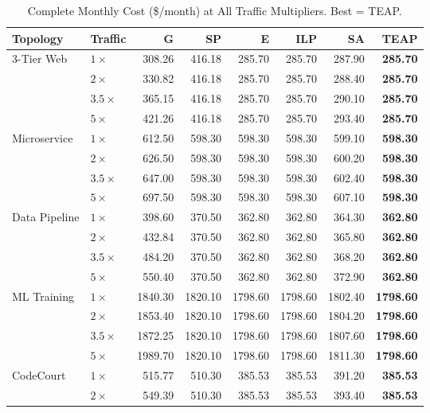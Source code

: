 \documentclass[10pt,journal]{IEEEtran}
\begin{document}
\begin{table}[!t]
\centering
\caption{Complete Monthly Cost (\$/month) at All Traffic Multipliers. Best = TEAP.}\label{tab:full_results}
\scriptsize\setlength{\tabcolsep}{2.0pt}
\begin{tabular}{llrrrrrr}
\toprule
Topology & Traffic & G & SP & E & ILP & SA & TEAP\\
\midrule
3-Tier Web
  & $1\times$ & 308.26 & 416.18 & 285.70 & 285.70 & 287.90 & \textbf{285.70}\\
  & $2\times$ & 330.82 & 416.18 & 285.70 & 285.70 & 288.40 & \textbf{285.70}\\
  & $3.5\times$ &365.15& 416.18 & 285.70 & 285.70 & 290.10 & \textbf{285.70}\\
  & $5\times$ & 421.26 & 416.18 & 285.70 & 285.70 & 293.40 & \textbf{285.70}\\
\midrule
Microservice
  & $1\times$ & 612.50 & 598.30 & 598.30 & 598.30 & 599.10 & \textbf{598.30}\\
  & $2\times$ & 626.50 & 598.30 & 598.30 & 598.30 & 600.20 & \textbf{598.30}\\
  & $3.5\times$ &647.00& 598.30 & 598.30 & 598.30 & 602.40 & \textbf{598.30}\\
  & $5\times$ & 697.50 & 598.30 & 598.30 & 598.30 & 607.10 & \textbf{598.30}\\
\midrule
Data Pipeline
  & $1\times$ & 398.60 & 370.50 & 362.80 & 362.80 & 364.30 & \textbf{362.80}\\
  & $2\times$ & 432.84 & 370.50 & 362.80 & 362.80 & 365.80 & \textbf{362.80}\\
  & $3.5\times$ &484.20& 370.50 & 362.80 & 362.80 & 368.20 & \textbf{362.80}\\
  & $5\times$ & 550.40 & 370.50 & 362.80 & 362.80 & 372.90 & \textbf{362.80}\\
\midrule
ML Training
  & $1\times$ &1840.30&1820.10 &1798.60 &1798.60 &1802.40& \textbf{1798.60}\\
  & $2\times$ &1853.40&1820.10 &1798.60 &1798.60 &1804.20& \textbf{1798.60}\\
  & $3.5\times$&1872.25&1820.10&1798.60 &1798.60 &1807.60& \textbf{1798.60}\\
  & $5\times$ &1989.70&1820.10 &1798.60 &1798.60 &1811.30& \textbf{1798.60}\\
\midrule
CodeCourt
  & $1\times$ & 515.77 & 510.30 & 385.53 & 385.53 & 391.20 & \textbf{385.53}\\
  & $2\times$ & 549.39 & 510.30 & 385.53 & 385.53 & 393.40 & \textbf{385.53}\\

\end{tabular}
\end{table}
\end{document}

